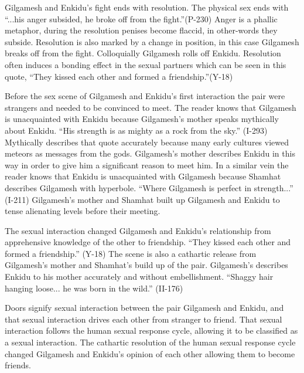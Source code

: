 \documentclass[12pt]{article}
\begin{document}
\par

Gilgamesh and Enkidu's fight ends with resolution. The physical sex ends with
``...his anger subsided, he broke off from the fight.''(P-230) Anger is a phallic
metaphor, during the resolution penises become flaccid, in other-words they
subside. Resolution is also marked by a change in position, in this case
Gilgamesh breaks off from the fight.
Colloquially Gilgamesh rolls off Enkidu. Resolution often induces a
bonding effect in the sexual partners which can be seen in this quote, ``They
kissed each other and formed a friendship.''(Y-18)

\par

Before the sex scene of Gilgamesh and Enkidu's first interaction the pair were
strangers and needed to be convinced to meet. The reader knows that Gilgamesh
is unacquainted with Enkidu because Gilgamesh's mother speaks mythically about
Enkidu. ``His strength is as mighty as a rock from the sky.'' (I-293)
Mythically describes that quote
accurately because many early cultures viewed meteors as messages from the gods.
Gilgamesh's mother describes Enkidu in this way in order to give him a
significant reason to meet him. In a similar vein the reader
knows that Enkidu is unacquainted with Gilgamesh because Shamhat describes
Gilgamesh with hyperbole. ``Where Gilgamesh is perfect in strength...'' (I-211)
Gilgamesh's mother and Shamhat built up Gilgamesh and Enkidu to tense alienating
levels before their meeting.

\par

The sexual interaction changed Gilgamesh and Enkidu's relationship from
apprehensive knowledge of the other to friendship. ``They kissed each other
and formed a friendship.'' (Y-18) The scene is also a cathartic release from
Gilgamesh's mother and Shamhat's build up of the pair. Gilgamesh's describes
Enkidu to his mother accurately and without embellishment.
``Shaggy hair hanging loose... he was born in the wild.'' (II-176) 

\par

Doors signify sexual interaction between the pair Gilgamesh and Enkidu, and that
sexual interaction drives each other from stranger to friend. That sexual
interaction follows the human sexual response cycle, allowing it to be
classified as a sexual interaction. The cathartic resolution of the human sexual
response cycle changed Gilgamesh and Enkidu's opinion of each other allowing
them to become friends. 
\end{document}
